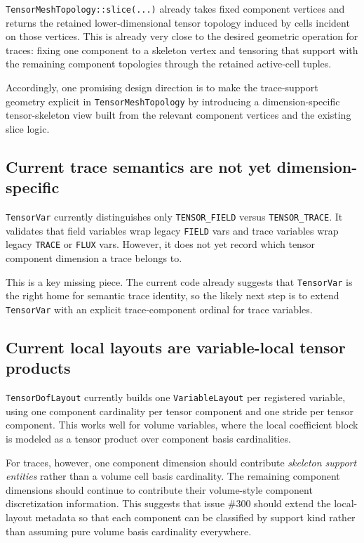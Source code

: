 \documentclass[11pt]{article}
\begin{document}
\texttt{TensorMeshTopology::slice(...)} already takes fixed component vertices and returns the retained lower-dimensional tensor topology induced by cells incident on those vertices. This is already very close to the desired geometric operation for traces: fixing one component to a skeleton vertex and tensoring that support with the remaining component topologies through the retained active-cell tuples.

Accordingly, one promising design direction is to make the trace-support geometry explicit in \texttt{TensorMeshTopology} by introducing a dimension-specific tensor-skeleton view built from the relevant component vertices and the existing slice logic.

\subsection{Current trace semantics are not yet dimension-specific}

\texttt{TensorVar} currently distinguishes only \texttt{TENSOR\_FIELD} versus \texttt{TENSOR\_TRACE}. It validates that field variables wrap legacy \texttt{FIELD} vars and trace variables wrap legacy \texttt{TRACE} or \texttt{FLUX} vars. However, it does not yet record which tensor component dimension a trace belongs to.

This is a key missing piece. The current code already suggests that \texttt{TensorVar} is the right home for semantic trace identity, so the likely next step is to extend \texttt{TensorVar} with an explicit trace-component ordinal for trace variables.

\subsection{Current local layouts are variable-local tensor products}

\texttt{TensorDofLayout} currently builds one \texttt{VariableLayout} per registered variable, using one component cardinality per tensor component and one stride per tensor component. This works well for volume variables, where the local coefficient block is modeled as a tensor product over component basis cardinalities.

For traces, however, one component dimension should contribute \emph{skeleton support entities} rather than a volume cell basis cardinality. The remaining component dimensions should continue to contribute their volume-style component discretization information. This suggests that issue \#300 should extend the local-layout metadata so that each component can be classified by support kind rather than assuming pure volume basis cardinality everywhere.
\end{document}
